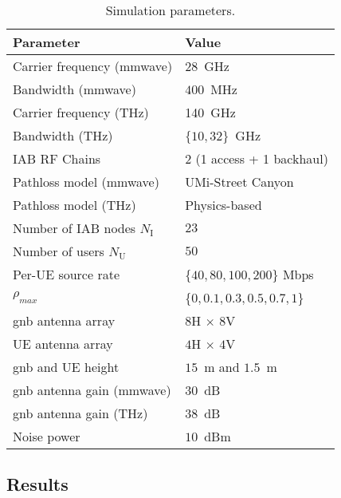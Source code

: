 \begin{table}[]
\caption{Simulation parameters.}
\label{Tab:parameters}
\centering
\footnotesize
\begin{tabular}{l|l}
    \toprule
    Parameter & Value \\ \midrule

    Carrier frequency (\gls{mmwave}) & $28$~GHz \\
    Bandwidth (\gls{mmwave}) & $400$~MHz \\
    Carrier frequency (THz) & 140~GHz  \\
    Bandwidth (THz) & $\{ 10,32 \}$~GHz \\
    IAB RF Chains & 2 (1 access + 1 backhaul) \\
    Pathloss model (\gls{mmwave}) & UMi-Street Canyon~\cite{3gpp.38.901} \\
    Pathloss model (THz) &  Physics-based~\cite{5995306} \\
    Number of IAB nodes $N_{\mathrm{I}}$ & $23$  \\
    Number of users $N_{\mathrm{U}}$ & $50$   \\
    Per-UE source rate & \{$40, 80, 100, 200$\} Mbps \\
    $\rho_{max}$ & \{$0, 0.1, 0.3, 0.5, 0.7, 1$\} \\
    \gls{gnb} antenna array & $8$H $\times$ $8$V\\
    UE antenna array & $4$H $\times$ $4$V\\
    \gls{gnb} and UE height & $15$~m and $1.5$~m \\
    \gls{gnb} antenna gain (\gls{mmwave}) & $30$~dB \\
    \gls{gnb} antenna gain (THz) & $38$~dB \\
    Noise power & $10$~dBm \\
\bottomrule
\end{tabular}
\end{table}



\subsection{Results}
\label{sub:results}


